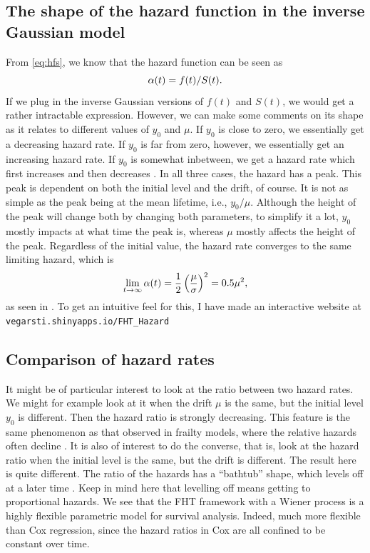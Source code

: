 \subsection{The shape of the hazard function in the inverse Gaussian model}
From \eqref{eq:hfs}, we know that the hazard function can be seen as
\begin{equation*}
    \alpha(t)=f(t)/S(t).
\end{equation*}
If we plug in the inverse Gaussian versions of $f(t)$ and $S(t)$, we would get a rather intractable expression.
However, we can make some comments on its shape as it relates to different values of $y_0$ and $\mu$.
If $y_0$ is close to zero, we essentially get a decreasing hazard rate.
If $y_0$ is far from zero, however, we essentially get an increasing hazard rate.
If $y_0$ is somewhat inbetween, we get a hazard rate which first increases and then decreases \citep{ABG}.
In all three cases, the hazard has a peak.
This peak is dependent on both the initial level and the drift, of course. 
It is not as simple as the peak being at the mean lifetime, i.e., $y_0/\mu$.
Although the height of the peak will change both by changing both parameters, to simplify it a lot, $y_0$ mostly impacts at what time the
peak is, whereas $\mu$ mostly affects the height of the peak.
Regardless of the initial value, the hazard rate converges to the same limiting hazard, which is
\begin{equation}
    \lim_{t\to\infty}\alpha(t)=\frac{1}{2}\left(\frac{\mu}{\sigma}\right)^2=0.5\mu^2,
\end{equation}
as seen in \citet{ABG}. To get an intuitive feel for this, I have made an interactive website at \verb|vegarsti.shinyapps.io/FHT_Hazard|

\subsection{Comparison of hazard rates}
It might be of particular interest to look at the ratio between two hazard rates. We might for example look at it when the drift $\mu$ is the same, but the initial level $y_0$ is different. Then the hazard ratio is strongly decreasing. This feature is the same phenomenon as that observed in frailty models, where the relative hazards often decline \citep{ABG}.
It is also of interest to do the converse, that is, look at the hazard ratio when the initial level is the same, but the drift is different. The result here is quite different. The ratio of the hazards has a ``bathtub'' shape, which levels off at a later time \citep{ABG}. Keep in mind here that levelling off means getting to proportional hazards.
We see that the FHT framework with a Wiener process is a highly flexible parametric model for survival analysis. Indeed, much more flexible than Cox regression, since the hazard ratios in Cox are all confined to be constant over time.

